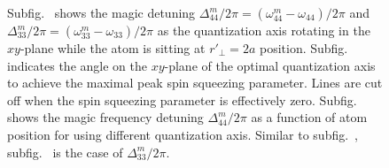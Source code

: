 \documentclass[preprint,aps,pra,onecolumn]{revtex4-1} %
\begin{document}
\begin{figure}
\begin{minipage}{.49\linewidth}
\end{minipage}
\begin{minipage}{.49\linewidth}
\centering
{}
\end{minipage}
\caption{Subfig.~\protect{} shows the magic detuning $ \Delta_{44}^m/2\pi=(\omega_{44}^m-\omega_{44})/2\pi $ and $ \Delta_{33}^m/2\pi=(\omega_{33}^m-\omega_{33})/2\pi $ as the quantization axis rotating in the $ xy $-plane while the atom is sitting at $ r'\!_\perp=2a $ position. Subfig.~\protect{} indicates the angle on the $ xy $-plane of the optimal quantization axis to achieve the maximal peak spin squeezing parameter. Lines are cut off when the spin squeezing parameter is effectively zero. Subfig.~\protect{} shows the magic frequency detuning $ \Delta_{44}^m/2\pi $ as a function of atom position for using different quantization axis. Similar to subfig.~\protect{}, subfig.~\protect{} is the case of $ \Delta_{33}^m/2\pi $. }\label{fig:optimalq_domega_magics}
\end{figure}
\end{document}
